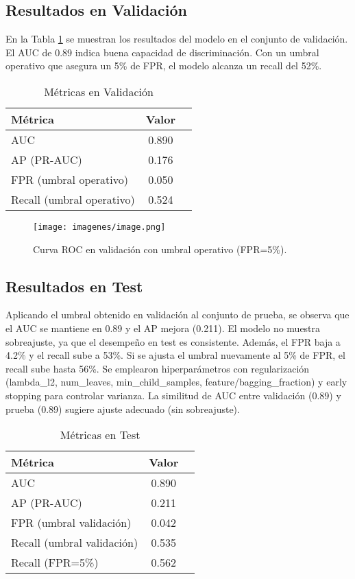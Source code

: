 \documentclass[runningheads]{llncs}
\begin{document}
\subsection{Resultados en Validación}
En la Tabla \ref{tab:val_metrics} se muestran los resultados del modelo en el conjunto de validación. 
El AUC de 0.89 indica buena capacidad de discriminación. 
Con un umbral operativo que asegura un 5\% de FPR, el modelo alcanza un recall del 52\%.

\begin{table}[!ht]
\centering
\caption{Métricas en Validación}
\label{tab:val_metrics}
\begin{tabular}{lcc}
\toprule
Métrica & Valor \\
\midrule
AUC & 0.890 \\
AP (PR-AUC) & 0.176 \\
FPR (umbral operativo) & 0.050 \\
Recall (umbral operativo) & 0.524 \\
\bottomrule
\end{tabular}
\end{table}

\begin{figure}[!ht]
    \centering
    \texttt{[image: imagenes/image.png]}
    \caption{Curva ROC en validación con umbral operativo (FPR=5\%).}
    \label{fig:roc_val}
\end{figure}

\subsection{Resultados en Test}
Aplicando el umbral obtenido en validación al conjunto de prueba, se observa que el AUC se mantiene en 0.89 y el AP mejora (0.211). 
El modelo no muestra sobreajuste, ya que el desempeño en test es consistente. 
Además, el FPR baja a 4.2\% y el recall sube a 53\%. 
Si se ajusta el umbral nuevamente al 5\% de FPR, el recall sube hasta 56\%.
Se emplearon hiperparámetros con regularización (lambda\_l2, num\_leaves, min\_child\_samples, feature/bagging\_fraction) y early stopping para controlar varianza. 
La similitud de AUC entre validación (0.89) y prueba (0.89) sugiere ajuste adecuado (sin sobreajuste).

\begin{table}[!ht]
\centering
\caption{Métricas en Test}
\label{tab:test_metrics}
\begin{tabular}{lcc}
\toprule
Métrica & Valor \\
\midrule
AUC & 0.890 \\
AP (PR-AUC) & 0.211 \\
FPR (umbral validación) & 0.042 \\
Recall (umbral validación) & 0.535 \\
Recall (FPR=5\%) & 0.562 \\
\bottomrule
\end{tabular}
\end{table}
\end{document}

